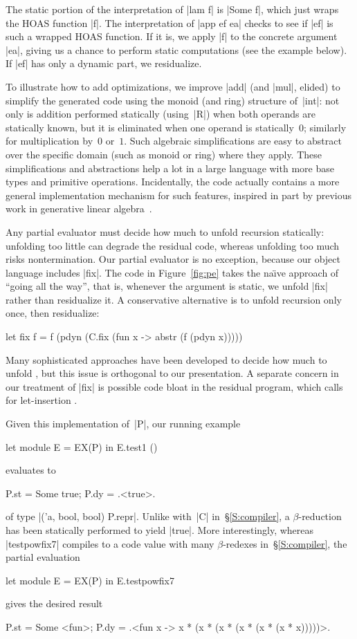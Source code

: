 The static portion of the interpretation of |lam f| is |Some f|, 
which just wraps the HOAS
function |f|. The interpretation of |app ef ea| 
checks to see if |ef| is such a wrapped
HOAS function. If it is, we apply |f| to the
concrete argument |ea|, giving us a chance to perform static
computations (see the example below). If
|ef| has only a dynamic part, we residualize.

To illustrate how to add optimizations, we improve |add| (and |mul|,
elided) to simplify the generated code using the monoid (and ring)
structure of~|int|: not only is addition performed statically
(using~|R|) when both operands are statically known, but it is
eliminated when one operand is statically~$0$; similarly for
multiplication by~$0$ or~$1$.  
Such algebraic simplifications are easy
to abstract over the specific domain (such as monoid or ring) where they
apply.  These simplifications and abstractions help a lot
in a large language with more base types and primitive operations.
Incidentally, the code actually contains a more general implementation
mechanism for such features, inspired in part by previous work in
generative linear algebra~\citep{CaretteKiselyov05}.

Any partial evaluator must decide how much to unfold recursion
statically: unfolding too little can degrade the residual code, whereas
unfolding too much risks nontermination.  Our partial evaluator is no
exception, because our object language includes |fix|.  The code in
Figure~\ref{fig:pe} takes the na\"\i ve approach of ``going all the
way'', that is, whenever the 
argument is static, we unfold |fix| rather than residualize it.
A conservative alternative is to unfold recursion only once, then residualize:
\begin{code}
let fix f = f (pdyn (C.fix (fun x -> abstr (f (pdyn x)))))
\end{code}
Many sophisticated approaches have been developed to decide how much to unfold
\citep{Jones-Mix,jones-partial}, but this issue is 
orthogonal to our presentation.
A separate concern in our treatment of |fix| is possible code bloat in
the residual program, which calls for let-insertion
\citep{BondorfDanvy,SwadiTahaKiselyovPasalic2006}.


Given this implementation of~|P|, our running example
\begin{code}
let module E = EX(P) in E.test1 ()
\end{code}
evaluates to
\begin{code}
{P.st = Some true; P.dy = .<true>.}
\end{code}
of type |('a, bool, bool) P.repr|.  Unlike with~|C| in~\S\ref{S:compiler},
a $\beta$-reduction has been statically performed to yield |true|.  More
interestingly, whereas |testpowfix7| compiles to a code value with many
$\beta$-redexes in~\S\ref{S:compiler}, the partial evaluation
\begin{code}
let module E = EX(P) in E.testpowfix7
\end{code}
gives the desired result
\begin{code}
{P.st = Some <fun>;
 P.dy = .<fun x -> x * (x * (x * (x * (x * (x * x)))))>.}
\end{code}

